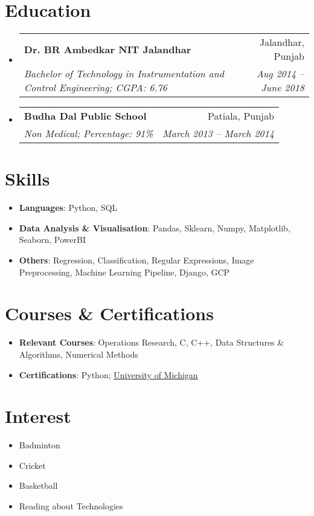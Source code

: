 \documentclass[letterpaper,11pt]{article}
\makeatletter
\newcommand{\resumeSubheading}[4]{
  \vspace{-1pt}\item
    \begin{tabular*}{0.97\textwidth}[t]{l@{\extracolsep{\fill}}r}
      \textbf{#1} & #2 \\
      \textit{\small#3} & \textit{\small #4} \\
    \end{tabular*}\vspace{-5pt}
}
\newcommand{\resumeSubHeadingListStart}{\begin{itemize}[leftmargin=*]}
\newcommand{\resumeSubHeadingListEnd}{\end{itemize}}
\makeatother
\begin{document}
\section{Education}
  \resumeSubHeadingListStart
    \resumeSubheading
      {Dr. BR Ambedkar NIT Jalandhar}{Jalandhar, Punjab}
      {Bachelor of Technology in Instrumentation and Control Engineering;  CGPA: 6.76}{Aug 2014 -- June 2018}
    \resumeSubheading
      {Budha Dal Public School}{Patiala, Punjab}
      {Non Medical; Percentage: 91\%}{March 2013 -- March 2014}
  \resumeSubHeadingListEnd

%
\section{Skills}
  \resumeSubHeadingListStart
    \item{
      \textbf{Languages}{: Python, SQL}
      \hfill
    }
    \item{
      \textbf{Data Analysis \& Visualisation}{: Pandas, Sklearn, Numpy, Matplotlib, Seaborn, PowerBI}
      \hfill
    }
    \item{
      \textbf{Others}{: Regression, Classification, Regular Expressions, Image Preprocessing, Machine Learning Pipeline, Django, GCP}
      \hfill
    }
  \resumeSubHeadingListEnd

\section{Courses \& Certifications}
  \resumeSubHeadingListStart
    \item{
      \textbf{Relevant Courses}{: Operations Research, C, C++, Data Structures \& Algorithms, Numerical Methods}
      \hfill
    }
    \item{
      \textbf{Certifications}{: Python}; \underline{\href{https://www.coursera.org/account/accomplishments/certificate/BGRL6KFPRFAL}{University of Michigan}}
      \hfill
    }
  \resumeSubHeadingListEnd

\section{Interest}
  \resumeSubHeadingListStart
    \item{
      {Badminton}
      \hfill
    }
    \item{
      {Cricket}
      \hfill
    }
    \item{
      {Basketball}
      \hfill
    }
    \item{
      {Reading about Technologies}
      \hfill
    }
  \resumeSubHeadingListEnd


\end{document}
